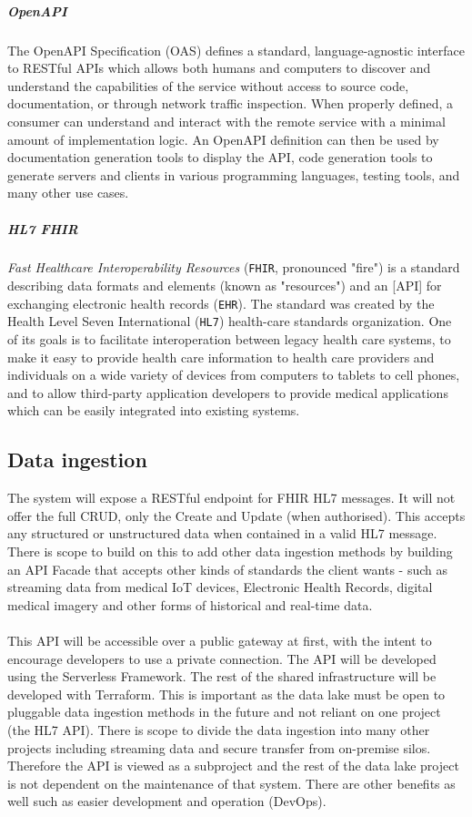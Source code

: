 \documentclass[10pt]{article}
\begin{document}
\subparagraph{OpenAPI}
The OpenAPI Specification (OAS) defines a standard, language-agnostic interface to RESTful APIs which allows both humans and computers to discover and understand the capabilities of the service without access to source code, documentation, or through network traffic inspection. When properly defined, a consumer can understand and interact with the remote service with a minimal amount of implementation logic. An OpenAPI definition can then be used by documentation generation tools to display the API, code generation tools to generate servers and clients in various programming languages, testing tools, and many other use cases. \cite{openapi}

\subparagraph{HL7 FHIR}
\textit{Fast Healthcare Interoperability Resources} (\texttt{FHIR}, pronounced "fire") is a standard describing data formats and elements (known as "resources") and an [API] for exchanging electronic health records (\texttt{EHR}). The standard was created by the Health Level Seven International (\texttt{HL7}) health-care standards organization. One of its goals is to facilitate interoperation between legacy health care systems, to make it easy to provide health care information to health care providers and individuals on a wide variety of devices from computers to tablets to cell phones, and to allow third-party application developers to provide medical applications which can be easily integrated into existing systems. \cite{fhir}

\subsection{Data ingestion}
The system will expose a RESTful endpoint for FHIR HL7 messages. It will not offer the full CRUD, only the Create and Update (when authorised). This accepts any structured or unstructured data when contained in a valid HL7 message. There is scope to build on this to add other data ingestion methods by building an API Facade that accepts other kinds of standards the client wants - such as streaming data from medical IoT devices, Electronic Health Records, digital medical imagery and other forms of historical and real-time data. \\\\This API will be accessible over a public gateway at first, with the intent to encourage developers to use a private connection. The API will be developed using the Serverless Framework. The rest of the shared infrastructure will be developed with Terraform. This is important as the data lake must be open to pluggable data ingestion methods in the future and not reliant on one project (the HL7 API). There is scope to divide the data ingestion into many other projects including streaming data and secure transfer from on-premise silos. Therefore the API is viewed as a subproject and the rest of the data lake project is not dependent on the maintenance of that system. There are other benefits as well such as easier development and operation (DevOps).
\end{document}
